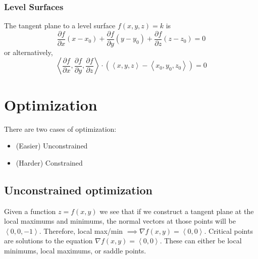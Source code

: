 \documentclass[12pt]{article}
\theoremstyle{plain} %
\theoremstyle{definition}
\theoremstyle{definition}
\theoremstyle{definition}
\theoremstyle{remark}
\newcommand{\angled}[1]{\left\langle {#1} \right\rangle}
\begin{document}
\subsubsection{Level Surfaces}
The tangent plane to a level surface $f(x,y,z) = k$ is
\[  \frac{\partial f}{\partial x} (x-x_0) +
    \frac{\partial f}{\partial y} (y-y_0) +
    \frac{\partial f}{\partial z} (z-z_0) = 0\]
or alternatively,
\[  \angled{\frac{\partial f}{\partial x}, \frac{\partial f}{\partial y}, \frac{\partial f}{\partial z}} \cdot \left( \angled{x,y,z}-\angled{x_0,y_0,z_0} \right) = 0\]
\section{Optimization}
There are two cases of optimization:
\begin{itemize}
    \item (Easier) Unconstrained
    \item (Harder) Constrained
\end{itemize}
\subsection{Unconstrained optimization}
Given a function $z=f(x,y)$ we see that if we construct a tangent plane at the local maximums and minimums, the normal vectors at those points will be $\angled{0,0,-1}$. Therefore, local max/min $\implies \nabla f(x,y) = \angled{0,0}.$ Critical points are solutions to the equation $\nabla f(x,y) = \angled{0,0}$. These can either be local minimums, local maximums, or saddle points.
\end{document}
